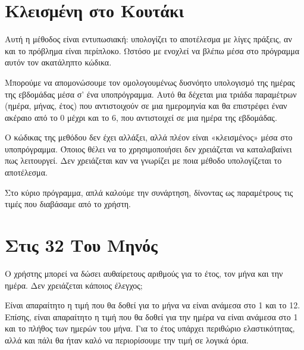 \documentclass[a4paper,11pt,oneside]{book}
\begin{document}


\section{Κλεισμένη στο Κουτάκι}

\begin{question}
Αυτή η μέθοδος είναι εντυπωσιακή: υπολογίζει το αποτέλεσμα με λίγες πράξεις, αν και το πρόβλημα είναι περίπλοκο. Ωστόσο με ενοχλεί να βλέπω μέσα στο πρόγραμμα αυτόν τον ακατάληπτο κώδικα.
\end{question}

Μπορούμε να απομονώσουμε τον ομολογουμένως δυσνόητο υπολογισμό της ημέρας της εβδομάδας μέσα σ' ένα υποπρόγραμμα. Αυτό θα δέχεται μια τριάδα παραμέτρων (ημέρα, μήνας, έτος) που αντιστοιχούν σε μια ημερομηνία και θα επιστρέφει έναν ακέραιο από το 0 μέχρι και το 6, που αντιστοιχεί σε μια ημέρα της εβδομάδας. 


Ο κώδικας της μεθόδου δεν έχει αλλάξει, αλλά πλέον είναι «κλεισμένος» μέσα στο υποπρόγραμμα. Όποιος θέλει να το χρησιμοποιήσει δεν χρειάζεται να καταλαβαίνει πως λειτουργεί. Δεν χρειάζεται καν να γνωρίζει με ποια μέθοδο υπολογίζεται το αποτέλεσμα. 

Στο κύριο πρόγραμμα, απλά καλούμε την συνάρτηση, δίνοντας ως παραμέτρους τις τιμές που διαβάσαμε από το χρήστη.



\section{Στις 32 Του Μηνός}

\begin{question}
Ο χρήστης μπορεί να δώσει αυθαίρετους αριθμούς για το έτος, τον μήνα και την ημέρα. Δεν χρειάζεται κάποιος έλεγχος;
\end{question}

Είναι απαραίτητο η τιμή που θα δοθεί για το μήνα να είναι ανάμεσα στο 1 και το 12. Επίσης, είναι απαραίτητο η τιμή που θα δοθεί για την ημέρα να είναι ανάμεσα στο 1 και το πλήθος των ημερών του μήνα. Για το έτος υπάρχει περιθώριο ελαστικότητας, αλλά και πάλι θα ήταν καλό να περιορίσουμε την τιμή σε λογικά όρια. 
\end{document}
